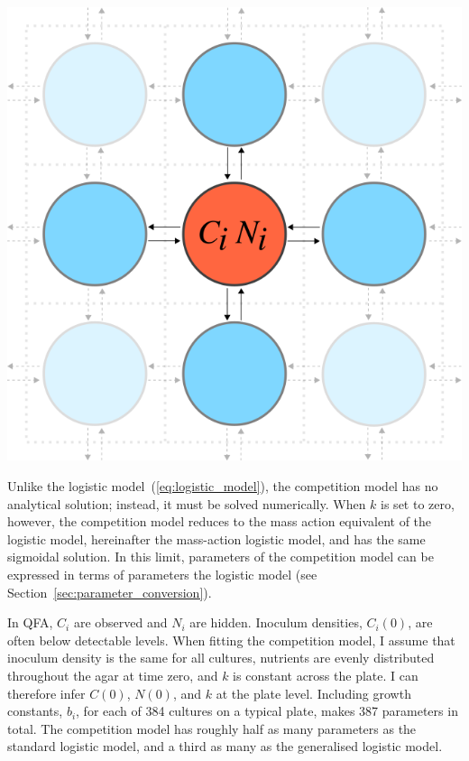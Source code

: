 \begin{Figure}
  \centering
  \includegraphics[width=\linewidth]{comp_model/comp_model_schematic2}
  \label{fig:comp_model_schematic}
\end{Figure}


Unlike the logistic model~(\ref{eq:logistic_model}), the competition
model has no analytical solution; instead, it must be solved
numerically. When \(k\) is set to zero, however, the competition model
reduces to the mass action equivalent of the logistic model,
hereinafter the mass-action logistic model, and has the same sigmoidal
solution. In this limit, parameters of the competition model can be
expressed in terms of parameters the logistic model (see
Section~\ref{sec:parameter_conversion}).

In QFA, \(C_{i}\) are observed and \(N_{i}\) are hidden. Inoculum
densities, \(C_{i}(0)\), are often below detectable levels. When
fitting the competition model, I assume that inoculum density is the
same for all cultures, nutrients are evenly distributed throughout the
agar at time zero, and \(k\) is constant across the plate. I can
therefore infer \(C(0)\), \(N(0)\), and \(k\) at the plate
level. Including growth constants, \(b_{i}\), for each of 384 cultures
on a typical plate, makes 387 parameters in total. The competition
model has roughly half as many parameters as the standard logistic
model, and a third as many as the generalised logistic model.

